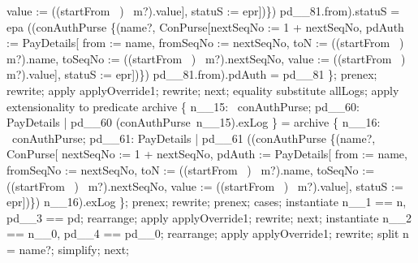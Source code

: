 \begin{LPScript}
\begin{zproof}[lPromotedAuxWorldStartFromType]
                        value := ((startFrom~ \inv)~ m?).value],
                    statuS := epr])\}) pd\_\_81.from).statuS = epa
                \land ((conAuthPurse \oplus \{(name?, \theta ConPurse[nextSeqNo := 1 + nextSeqNo,
                    pdAuth := \theta PayDetails[
                            from := name, fromSeqNo := nextSeqNo,
                            toN := ((startFrom~ \inv)~ m?).name,
                            toSeqNo := ((startFrom~ \inv)~ m?).nextSeqNo,
                            value := ((startFrom~ \inv)~ m?).value],
                        statuS := epr])\}) pd\_\_81.from).pdAuth = pd\_\_81 \};
        prenex;
        rewrite;
        apply applyOverride1;
        rewrite;
    next;
        equality substitute allLogs;
        apply extensionality to predicate
            archive \cup \{ n\_\_15: \dom~conAuthPurse; pd\_\_60: PayDetails
                | pd\_\_60 \in (conAuthPurse~n\_\_15).exLog \}
            = archive \cup \{ n\_\_16: \dom~conAuthPurse; pd\_\_61: PayDetails
                | pd\_\_61 \in ((conAuthPurse \oplus \{(name?, \theta ConPurse[
                    nextSeqNo := 1 + nextSeqNo,
                    pdAuth := \theta PayDetails[
                        from := name, fromSeqNo := nextSeqNo,
                        toN := ((startFrom~ \inv)~ m?).name,
                        toSeqNo := ((startFrom~ \inv)~ m?).nextSeqNo,
                        value := ((startFrom~ \inv)~ m?).value],
                    statuS := epr])\}) n\_\_16).exLog \};
        prenex;
        rewrite;
        prenex;
        cases;
            instantiate n\_\_1 == n, pd\_\_3 == pd;
            rearrange;
            apply applyOverride1;
            rewrite;
        next;
            instantiate n\_\_2 == n\_\_0, pd\_\_4 == pd\_\_0;
            rearrange;
            apply applyOverride1;
            rewrite;
            split \lnot n = name?;
            simplify;
    next;
\end{zproof}\end{LPScript}


